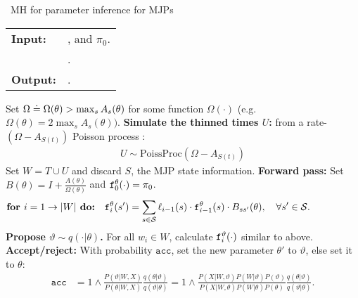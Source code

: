 \begin{algorithm}[H]
   \caption{\Naive\  MH for parameter inference for MJPs }
   \label{alg:MH_naive}
  \begin{tabular}{l l}
   \textbf{Input:  } & \text{Observations $X$}, 
                       \text{the MJP path $S(t) = (S, T)$, the  parameters $\theta$ }and $\pi_0$.\\ 
                     & \text{A  Metropolis-Hasting proposal $q(\cdot | \theta)$}.\\
   \textbf{Output:  }& \text{A new MJP trajectory $S'(t) = (S', T')$, 
                            new MJP parameters $\theta'$}.\\
   \hline
   \end{tabular}
   \begin{algorithmic}[1]
     \State Set $\Omega \doteq \Omega(\theta) > \max_s{A_s(\theta)}$ for
     some function $\Omega(\cdot)$ (e.g.\ $\Omega(\theta) = 
      2\max_s A_s(\theta))$.
      \State \textbf{ Simulate the thinned times $U$:} from a rate-$(\Omega-A_{S(t)})$ Poisson process : 
\begin{align*}
  U \sim \text{PoissProc}(\Omega - A_{S(t)}) 
\end{align*}
      \State 
    Set $W = T \cup U$ and discard $S$, the MJP state information.
    \State 
    \textbf{Forward pass:}
    Set $B(\theta) = I + \frac{A(\theta)}{\Omega(\theta)}$ and
    $\mathtt{f}^\theta_0(\cdot) = \pi_0$.
    $$\textbf{for } i=1\rightarrow |W|\textbf{ do:} \quad \mathtt{f}^{\theta}_i(s') = \sum_{s \in {\mathcal S}} \ell_{i-1}(s) \cdot \mathtt{f}^\theta_{i-1}(s)\cdot B_{ss'}(\theta), \quad \forall s' \in {\mathcal S}.\qquad\qquad\quad $$
    \State \textbf{Propose $\vartheta \sim q(\cdot| \theta)$.}
      For all $w_i \in W$, calculate $\mathtt{f}^\vartheta_i(\cdot)$ similar to above.
      \State \textbf{Accept/reject:} With probability $\texttt{acc}$, set the new parameter $\theta'$ to $\vartheta$, else set it to $\theta$: %
          \begin{align}
            \label{eq:ncp_acc}
            \texttt{acc} &=  1 \wedge \frac{P(\vartheta|W, X)}{P(\theta|W, X)} \frac{q(\theta|\vartheta)}{q(\vartheta|\theta)}
          =  1 \wedge \frac{P(X| W,\vartheta) P(W | \vartheta)P(\vartheta)}
            {P(X|W, \theta)P(W | \theta)P(\theta)} \frac{q(\theta|\vartheta)}{q(\vartheta|\theta)}.

\end{align}
\end{algorithmic}
\end{algorithm}
